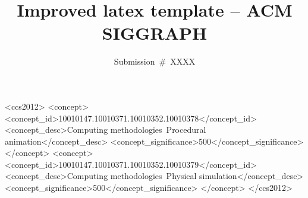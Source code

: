 



\author{Submission~\#~XXXX}
\renewcommand{\shortauthors}{Submission \#XXXX}

\title{Improved latex template -- ACM SIGGRAPH}

\begin{CCSXML}
<ccs2012>
<concept> <concept_id>10010147.10010371.10010352.10010378</concept_id>
<concept_desc>Computing methodologies~Procedural animation</concept_desc>
<concept_significance>500</concept_significance>
</concept>
<concept>
<concept_id>10010147.10010371.10010352.10010379</concept_id>
<concept_desc>Computing methodologies~Physical simulation</concept_desc>
<concept_significance>500</concept_significance>
</concept>
</ccs2012>
\end{CCSXML}

